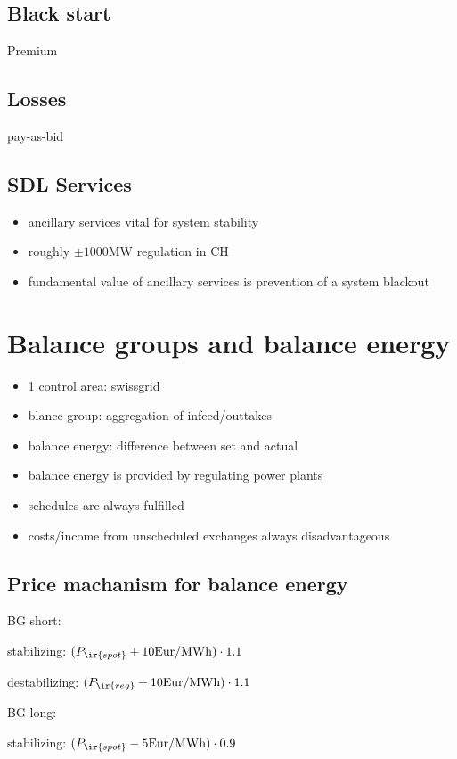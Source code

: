 \documentclass[fs, footer]{latex4ei}
\begin{document}
\begin{multicols*}{4}
\subsection{Black start} Premium

\subsection{Losses} pay-as-bid

\subsection{SDL Services}
\begin{itemize}
 	\item ancillary services vital for system stability
 	\item roughly $\pm 1000 \si{\mega \watt}$ regulation in CH
 	\item fundamental value of ancillary services is prevention of a system blackout
 \end{itemize} 
\section{Balance groups and balance energy}
\begin{itemize}
	\item 1 control area: swissgrid
	\item blance group: aggregation of infeed/outtakes
	\item balance energy: difference between set and actual
	\item balance energy is provided by regulating power plants
	\item schedules are always fulfilled
	\item costs/income from unscheduled exchanges always disadvantageous
\end{itemize}


\subsection{Price machanism for balance energy}

BG short:

stabilizing: $(P_{\ir{spot}} + 10 \text{Eur/MWh}) \cdot 1.1$

destabilizing: $(P_{\ir{reg}} + 10 \text{Eur/MWh}) \cdot 1.1$

BG long:

stabilizing: $(P_{\ir{spot}} - 5 \text{Eur/MWh}) \cdot 0.9$


\end{multicols*}
\end{document}
